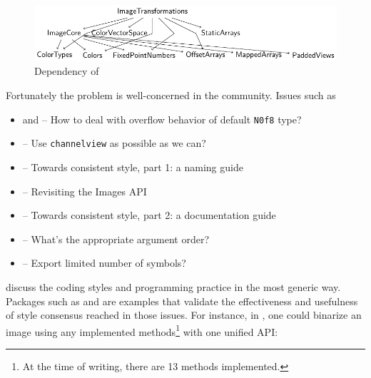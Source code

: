\begin{figure}
    \includegraphics[width=\textwidth]{figures/imagetransformations_dep.pdf}
    \caption{Dependency of \imagetransformations{}}\label{fig:imagetransformations_dep}
\end{figure}

Fortunately the problem is well-concerned in the community. Issues such as
\begin{itemize}
    \item {} and  -- How to deal with overflow behavior of default \texttt{N0f8} type?
    \item {} -- Use \texttt{channelview} as possible as we can?
    \item {} -- Towards consistent style, part 1: a naming guide
    \item {} -- Revisiting the Images API
    \item {} -- Towards consistent style, part 2: a documentation guide
    \item {} -- What's the appropriate argument order?
    \item {} -- Export limited number of symbols?
\end{itemize}
discuss the coding styles and programming practice in the most generic way. Packages such as \repohistogramthresholding and \repoimagebinarization are examples that validate the effectiveness and usefulness of style consensus reached in those issues. For instance, in \imagebinarization, one could binarize an image using any implemented methods\footnote{At the time of writing, there are 13 methods implemented.} with one unified API:


\newpage
